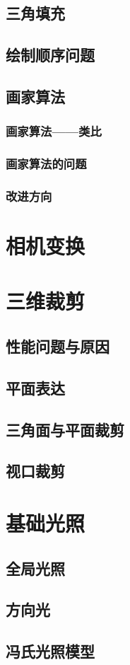 \documentclass[12pt,oneside,a4paper]{ctexart}
\begin{document}
\subsection{三角填充}
\subsection{绘制顺序问题}
\subsection{画家算法}
\subsubsection{画家算法——类比}
\subsubsection{画家算法的问题}
\subsubsection{改进方向}
\section{相机变换}
\section{三维裁剪}
\subsection{性能问题与原因}
\subsection{平面表达}
\subsection{三角面与平面裁剪}
\subsection{视口裁剪}
\section{基础光照}
\subsection{全局光照}
\subsection{方向光}
\subsection{冯氏光照模型}
\end{document}
